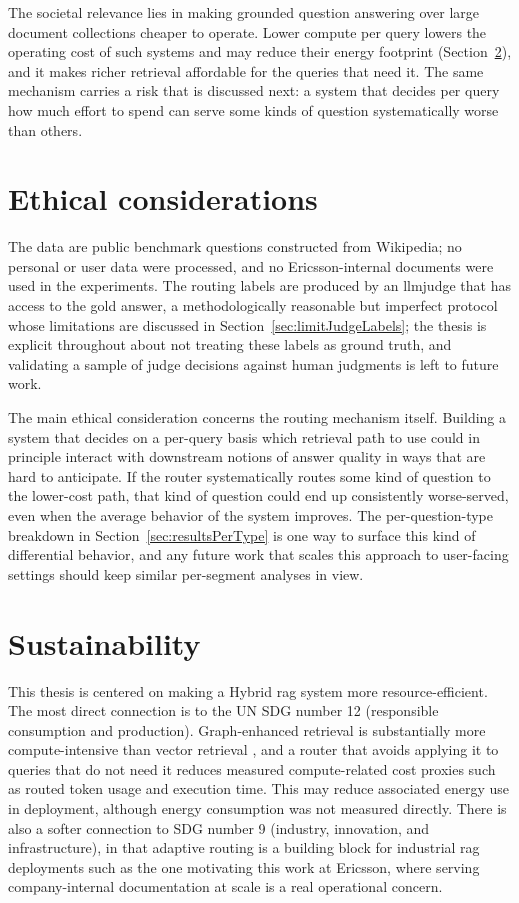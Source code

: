 \documentclass[english, bibtex]{kththesis}               %
\numberwithin{listing}{chapter}
\begin{document}
The societal relevance lies in making grounded question answering over large document collections cheaper to operate. Lower compute per query lowers the operating cost of such systems and may reduce their energy footprint (Section~\ref{sec:discSustainability}), and it makes richer retrieval affordable for the queries that need it. The same mechanism carries a risk that is discussed next: a system that decides per query how much effort to spend can serve some kinds of question systematically worse than others.

\section{Ethical considerations}
\label{sec:discEthics}

The data are public benchmark questions constructed from Wikipedia; no personal or user data were processed, and no Ericsson-internal documents were used in the experiments. The routing labels are produced by an \gls{llmjudge} that has access to the gold answer, a methodologically reasonable but imperfect protocol whose limitations are discussed in Section~\ref{sec:limitJudgeLabels}; the thesis is explicit throughout about not treating these labels as ground truth, and validating a sample of judge decisions against human judgments is left to future work.

The main ethical consideration concerns the routing mechanism itself. Building a system that decides on a per-query basis which retrieval path to use could in principle interact with downstream notions of answer quality in ways that are hard to anticipate. If the router systematically routes some kind of question to the lower-cost path, that kind of question could end up consistently worse-served, even when the average behavior of the system improves. The per-question-type breakdown in Section~\ref{sec:resultsPerType} is one way to surface this kind of differential behavior, and any future work that scales this approach to user-facing settings should keep similar per-segment analyses in view.

\section{Sustainability}
\label{sec:discSustainability}

This thesis is centered on making a Hybrid \gls{rag} system more resource-efficient. The most direct connection is to the \gls{UN} \gls{SDG} number 12 (responsible consumption and production). Graph-enhanced retrieval is substantially more compute-intensive than vector retrieval \cite{lightrag2024,microsoft2024graphragcosts}, and a router that avoids applying it to queries that do not need it reduces measured compute-related cost proxies such as routed token usage and execution time. This may reduce associated energy use in deployment, although energy consumption was not measured directly. There is also a softer connection to \gls{SDG} number 9 (industry, innovation, and infrastructure), in that adaptive routing is a building block for industrial \gls{rag} deployments such as the one motivating this work at Ericsson, where serving company-internal documentation at scale is a real operational concern.
\end{document}
